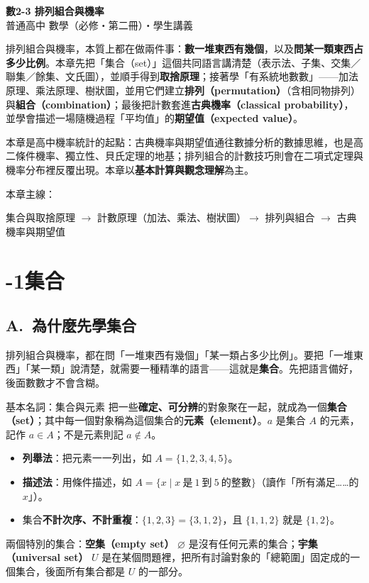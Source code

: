 \documentclass[11pt]{article}
\begin{document}
\begin{center}
{\sffamily\Huge\bfseries 數2-3 排列組合與機率}\\[3pt]
{\sffamily\large 普通高中 數學（必修・第二冊）・學生講義}
\end{center}
\vspace{0.6em}

排列組合與機率，本質上都在做兩件事：\textbf{數一堆東西有幾個}，以及\textbf{問某一類東西占多少比例}。本章先把「集合（set）」這個共同語言講清楚（表示法、子集、交集／聯集／餘集、文氏圖），並順手得到\textbf{取捨原理}；接著學「有系統地數數」——加法原理、乘法原理、樹狀圖，並用它們建立\textbf{排列（permutation）}（含相同物排列）與\textbf{組合（combination）}；最後把計數套進\textbf{古典機率（classical probability）}，並學會描述一場隨機過程「平均值」的\textbf{期望值（expected value）}。

本章是高中機率統計的起點：古典機率與期望值通往數據分析的數據思維，也是高二條件機率、獨立性、貝氏定理的地基；排列組合的計數技巧則會在二項式定理與機率分布裡反覆出現。本章以\textbf{基本計算與觀念理解}為主。

\medskip
本章主線：

\begin{center}
集合與取捨原理 $\rightarrow$ 計數原理（加法、乘法、樹狀圖）$\rightarrow$ 排列與組合 $\rightarrow$ 古典機率與期望值
\end{center}

\section*{-1\quad 集合}

\subsection*{\sffamily A.\ 為什麼先學集合}

排列組合與機率，都在問「一堆東西有幾個」「某一類占多少比例」。要把「一堆東西」「某一類」說清楚，就需要一種精準的語言——這就是\textbf{集合}。先把語言備好，後面數數才不會含糊。

\begin{補充框}{基本名詞：集合與元素}
把一些\textbf{確定、可分辨}的對象聚在一起，就成為一個\textbf{集合（set）}；其中每一個對象稱為這個集合的\textbf{元素（element）}。$a$ 是集合 $A$ 的元素，記作 $a\in A$；不是元素則記 $a\notin A$。
\begin{itemize}\setlength{\itemsep}{1pt}
\item \textbf{列舉法}：把元素一一列出，如 $A=\{1,2,3,4,5\}$。
\item \textbf{描述法}：用條件描述，如 $A=\{x \mid x\ \text{是}\ 1\ \text{到}\ 5\ \text{的整數}\}$（讀作「所有滿足……的 $x$」）。
\item 集合\textbf{不計次序、不計重複}：$\{1,2,3\}=\{3,1,2\}$，且 $\{1,1,2\}$ 就是 $\{1,2\}$。
\end{itemize}
兩個特別的集合：\textbf{空集（empty set）} $\varnothing$ 是沒有任何元素的集合；\textbf{宇集（universal set）} $U$ 是在某個問題裡，把所有討論對象的「總範圍」固定成的一個集合，後面所有集合都是 $U$ 的一部分。
\end{補充框}
\end{document}
